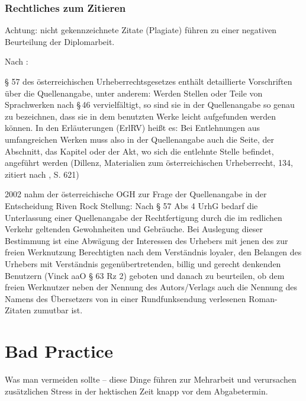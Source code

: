 \documentclass[a4paper,ngerman,naustrian,DIV=12,BCOR=1cm]{scrbook}
\begin{document}
\subsubsection{Rechtliches zum Zitieren}

Achtung: nicht gekennzeichnete Zitate (Plagiate) führen zu einer negativen
Beurteilung der Diplomarbeit.

Nach \cite{wiki:quelle}:

§ 57 des österreichischen Urheberrechtsgesetzes\cite{ris57} enthält
detaillierte Vorschriften über die Quellenangabe, unter anderem: Werden
Stellen oder Teile von Sprachwerken nach §\,46 vervielfältigt, so
sind sie in der Quellenangabe so genau zu bezeichnen, dass sie in
dem benutzten Werke leicht aufgefunden werden können. In den Erläuterungen
(ErlRV) heißt es: Bei Entlehnungen aus umfangreichen Werken muss also
in der Quellenangabe auch die Seite, der Abschnitt, das Kapitel oder
der Akt, wo sich die entlehnte Stelle befindet, angeführt werden (Dillenz,
Materialien zum österreichischen Urheberrecht, 134, zitiert nach \cite{dittrich},
S. 621)

2002 nahm der österreichische OGH zur Frage der Quellenangabe in der
Entscheidung Riven Rock Stellung: Nach § 57 Abs 4 UrhG bedarf die
Unterlassung einer Quellenangabe der Rechtfertigung durch die im redlichen
Verkehr geltenden Gewohnheiten und Gebräuche. Bei Auslegung dieser
Bestimmung ist eine Abwägung der Interessen des Urhebers mit jenen
des zur freien Werknutzung Berechtigten nach dem Verständnis loyaler,
den Belangen des Urhebers mit Verständnis gegenübertretenden, billig
und gerecht denkenden Benutzern (Vinck aaO § 63 Rz 2) geboten und
danach zu beurteilen, ob dem freien Werknutzer neben der Nennung des
Autors/Verlags auch die Nennung des Namens des Übersetzers von in
einer Rundfunksendung verlesenen Roman-Zitaten zumutbar ist.


\section{Bad Practice}

Was man vermeiden sollte -- diese Dinge führen zur Mehrarbeit und
verursachen zusätzlichen Stress in der hektischen Zeit knapp vor dem
Abgabetermin.
\end{document}
